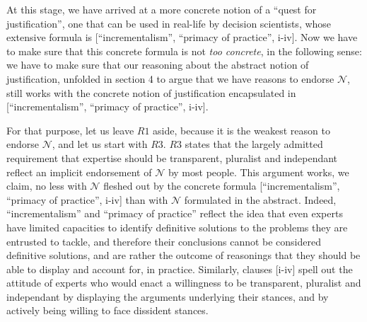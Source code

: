 \documentclass[preprint, french, english, 11pt, authoryear]{elsarticle}%
\newcommand{\adv}{\mathscr{N}}
\begin{document}
At this stage, we have arrived at a more concrete notion of a ``quest for justification'', one that can be used in real-life by decision scientists, whose extensive formula is [``incrementalism'', ``primacy of practice'', i-iv]. Now we have to make sure that this concrete formula is not \emph{too concrete}, in the following sense: we have to make sure that our reasoning about the abstract notion of justification, unfolded in section 4 to argue that we have reasons to endorse $\adv$, still works with the concrete notion of justification encapsulated in [``incrementalism'', ``primacy of practice'', i-iv].

For that purpose, let us leave $R1$ aside, because it is the weakest reason to endorse $\adv$, and let us start with $R3$. $R3$ states that the largely admitted requirement that expertise should be transparent, pluralist and independant reflect an implicit endorsement of $\adv$ by most people. This argument works, we claim, no less with $\adv$ fleshed out by the concrete formula [``incrementalism'', ``primacy of practice'', i-iv] than with $\adv$ formulated in the abstract. Indeed, ``incrementalism'' and ``primacy of practice'' reflect the idea that even experts have limited capacities to identify definitive solutions to the problems they are entrusted to tackle, and therefore their conclusions cannot be considered definitive solutions, and are rather the outcome of reasonings that they should be able to display and account for, in practice. Similarly, clauses [i-iv] spell out the attitude of experts who would enact a willingness to be transparent, pluralist and independant by displaying the arguments underlying their stances, and by actively being willing to face dissident stances.
\end{document}
